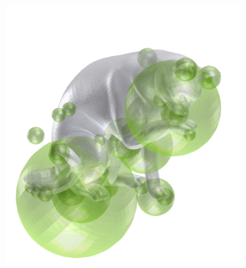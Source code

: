 \begin{figure}[t]
\begin{subfigure}[t]{0.30\linewidth}
		\vspace{-7mm}
		\label{fig/eval/testshapes/surf}
	\end{subfigure}
	\begin{subfigure}[t]{0.30\linewidth} 
		\centering 
		\includegraphics[width=1\linewidth]{./fig/eval/cat_harris.png} 

\end{subfigure}
\end{figure}
